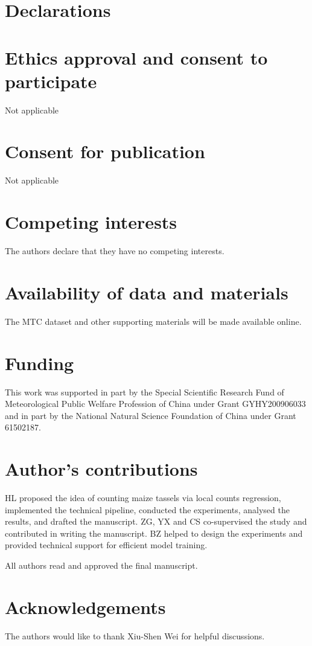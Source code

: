 \documentclass[twocolumn]{bmcart}%
\begin{document}
\begin{backmatter}

\section*{Declarations}

\section*{Ethics approval and consent to participate}
Not applicable

\section*{Consent for publication}
Not applicable

\section*{Competing interests}
The authors declare that they have no competing interests.

\section*{Availability of data and materials}
The MTC dataset and other supporting materials will be made available online.



\section*{Funding}
This work was supported in part by the Special Scientific Research Fund of Meteorological Public Welfare Profession of China under Grant GYHY200906033 and in part by the National Natural Science Foundation of China under Grant 61502187.

\section*{Author's contributions}
HL proposed the idea of counting maize tassels via local counts regression, implemented the technical pipeline, conducted the experiments, analysed the results, and drafted the manuscript. ZG, YX and CS co-supervised the study and contributed in writing the manuscript.
BZ helped to design the experiments and provided technical support
 for efficient model training.

 All authors read and approved the final manuscript.




\section*{Acknowledgements}
The authors would like to thank Xiu-Shen Wei for helpful discussions.






\end{backmatter}
\end{document}
